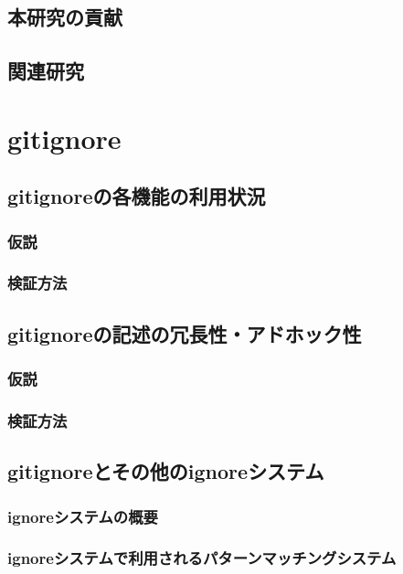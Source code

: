 \documentclass[xelatex,ja=standard,fontsize=10.5pt]{bxjsreport}
\begin{document}
\section{本研究の貢献}

\section{関連研究}

%
\chapter{\textrm{gitignore}}

\section{\textrm{gitignore}の各機能の利用状況}

\subsection{仮説}

\subsection{検証方法}

\section{\textrm{gitignore}の記述の冗長性・アドホック性}

\subsection{仮説}

\subsection{検証方法}

\section{\textrm{gitignore}とその他の\textrm{ignore}システム}

\subsection{\textrm{ignore}システムの概要}

\subsection{\textrm{ignore}システムで利用されるパターンマッチングシステム}
\end{document}
